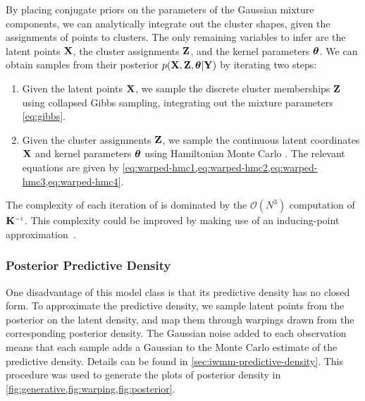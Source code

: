 By placing conjugate priors on the parameters of the Gaussian mixture components, we can analytically integrate out the cluster shapes, given the assignments of points to clusters.
The only remaining variables to infer are the latent points $\mathbf{X}$, the cluster assignments $\mathbf{Z}$, and the kernel parameters ${\boldsymbol{\theta}}$.
%
%
We can obtain samples from their posterior 
$p(\mathbf{X},\mathbf{Z}, {\boldsymbol{\theta}} | \mathbf{Y})$ 
by iterating two steps:
\begin{enumerate}
\item
Given the latent points $\mathbf{X}$, we sample the discrete cluster memberships $\mathbf{Z}$ using collapsed Gibbs sampling, integrating out the mixture parameters \eqref{eq:gibbs}.
\item 
Given the cluster assignments $\mathbf{Z}$, we sample the continuous latent coordinates $\mathbf{X}$ and kernel parameters ${\boldsymbol{\theta}}$ using Hamiltonian Monte Carlo \HMC{}.
The relevant equations are given by \cref{eq:warped-hmc1,eq:warped-hmc2,eq:warped-hmc3,eq:warped-hmc4}.
\end{enumerate}

The complexity of each iteration of \HMC{} is dominated by the $\mathcal{O}(N^3)$ computation of $\vK\inv$.
This complexity could be improved by making use of an inducing-point approximation~\citep{quinonero2005unifying,snelson2006sparse}.



\subsubsection{Posterior Predictive Density}

One disadvantage of this model class is that its predictive density has no closed form.
To approximate the predictive density, we sample latent points from the posterior on the latent density, and map them through warpings drawn from the corresponding posterior density.
The Gaussian noise added to each observation means that each sample adds a Gaussian to the Monte Carlo estimate of the predictive density.
Details can be found in \cref{sec:iwmm-predictive-density}.
This procedure was used to generate the plots of posterior density in \cref{fig:generative,fig:warping,fig:posterior}.






